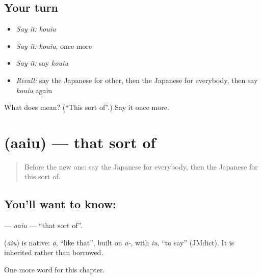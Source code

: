 \subsection*{Your turn}
\begin{itemize}
\raggedright
  \item \emph{Say it:} \emph{kouiu}
  \item \emph{Say it:} \emph{kouiu}, once more
  \item \emph{Say it:} say \emph{kouiu}
  \item \emph{Recall:} say the Japanese for other, then the Japanese for everybody, then say \emph{kouiu} again
\end{itemize}

\begin{tcolorbox}[breakable,colback=teal!4,colframe=teal!35!black,title={Before you move on}]
What does  mean? (\textquotedblleft{}This sort of\textquotedblright{}.) Say it once more.
\end{tcolorbox}
\section[\texorpdfstring{\ja{ああいう} (aaiu)}{ああいう (aaiu)}]{ (aaiu) — that sort of}

\label{lesson:JA-C84-aaiu}



\begin{quote}
Before the new one: say the Japanese for everybody, then the Japanese for this sort of.
\end{quote}

\subsection*{You'll want to know: }
\textbf{} — \emph{aaiu} — \textquotedblleft{}that sort of\textquotedblright{}.

\begin{cousinweb}
\textbf{} (\emph{āiu}) is native: \emph{ā}, \textquotedblleft{}like that\textquotedblright{}, built on \emph{a-}, with \emph{iu}, \textquotedblleft{}to say\textquotedblright{} (JMdict). It is inherited rather than borrowed.
\end{cousinweb}

\begin{grammarlens}[title={What you've built}]
One more word for this chapter.
\end{grammarlens}

